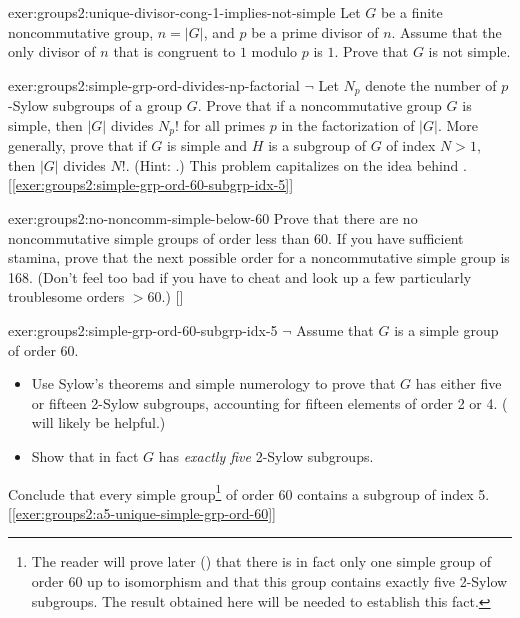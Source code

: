\begin{exer}{}{exer:groups2:unique-divisor-cong-1-implies-not-simple}
  Let $G$ be a finite noncommutative group, $n = |G|$, and $p$ be a
  prime divisor of $n$.  Assume that the only divisor of $n$ that is
  congruent to $1$ modulo $p$ is $1$. Prove that $G$ is not simple.
\end{exer}

\begin{exer}{}{exer:groups2:simple-grp-ord-divides-np-factorial}
  $\lnot$ Let $N_p$ denote the number of $p$-Sylow subgroups of a
  group $G$.  Prove that if a noncommutative group $G$ is simple, then
  $|G|$ divides $N_p!$
  for all primes $p$ in the factorization of $|G|$. More generally,
  prove that if $G$ is simple and $H$ is a subgroup of $G$ of index
  $N > 1$, then $|G|$ divides $N!$. (Hint:
  .) This problem
  capitalizes on the idea behind
  .
  [\ref{exer:groups2:simple-grp-ord-60-subgrp-idx-5}]
\end{exer}

\begin{exer}{}{exer:groups2:no-noncomm-simple-below-60}
  \exerused{} Prove that there are no noncommutative simple groups of
  order less than 60. If you have sufficient stamina, prove that the
  next possible order for a noncommutative simple group is 168. (Don't
  feel too bad if you have to cheat and look up a few particularly
  troublesome orders $> 60$.)
  []
\end{exer}

\begin{exer}{}{exer:groups2:simple-grp-ord-60-subgrp-idx-5}
  $\lnot$ Assume that $G$ is a simple group of order 60.
  \begin{itemize}
  \item Use Sylow's theorems and simple numerology to prove that $G$
    has either five or fifteen 2-Sylow subgroups, accounting for
    fifteen elements of order 2 or
    4. ( will
    likely be helpful.)
  \item Show that in fact $G$ has \emph{exactly five} 2-Sylow
    subgroups.
  \end{itemize}
  Conclude that every simple group\footnote{The reader will prove
    later () that there
    is in fact only one simple group of order 60 up to isomorphism and
    that this group contains exactly five 2-Sylow subgroups. The
    result obtained here will be needed to establish this fact.} of
  order 60 contains a subgroup of index
  5. [\ref{exer:groups2:a5-unique-simple-grp-ord-60}]
\end{exer}


